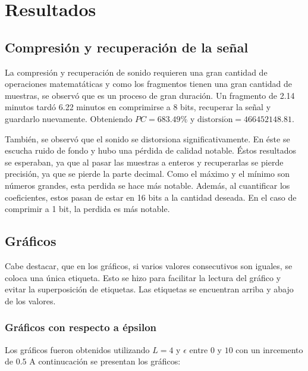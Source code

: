 \documentclass[12pt,a4paper]{article}
\begin{document}
\section{Resultados}

\subsection{Compresión y recuperación de la señal}

   	La compresión y recuperación de sonido requieren una gran cantidad de operaciones matematáticas y como los fragmentos tienen una gran cantidad de muestras, se observó que es un proceso de gran duración. Un fragmento de 2.14 minutos tardó 6.22 minutos en comprimirse a 8 bits, recuperar la señal y guardarlo nuevamente. Obteniendo $PC = 683.49 \%$ y $\mathrm{distorsi\acute{o}n} = 466452148.81$. 
    
    También, se observó que el sonido se distorsiona significativamente. En éste se escucha ruido de fondo y hubo una pérdida de calidad notable. Éstos resultados se esperaban, ya que al pasar las muestras a enteros y recuperarlas se pierde precisión, ya que se pierde la parte decimal. Como el máximo y el mínimo son números grandes, esta perdida se hace más notable. Además, al cuantificar los coeficientes, estos pasan de estar en 16 bits a la cantidad deseada. En el caso de comprimir a 1 bit, la perdida es más notable.
    
\subsection{Gráficos}

Cabe destacar, que en los gráficos, si varios valores consecutivos son iguales, se coloca una única etiqueta. Esto se hizo para facilitar la lectura del gráfico y evitar la superposición de etiquetas. Las etiquetas se encuentran arriba y abajo de los valores.

\subsubsection{Gráficos con respecto a épsilon}
    
	Los gráficos fueron obtenidos utilizando $L=4$ y $\epsilon$ entre $0$ y $10$ con un inrcemento de $0.5$  A continucación se presentan los gráficos:
    
\end{document}
